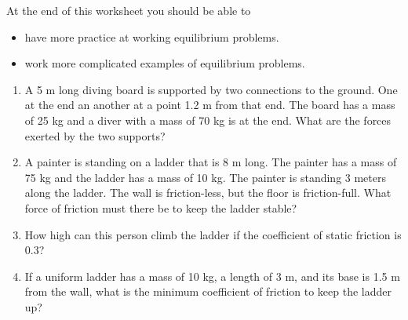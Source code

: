 At the end of this worksheet you should be able to  
\begin{itemize}
	\item have more practice at working equilibrium problems.
	\item work more complicated examples of equilibrium problems.

\end{itemize}


\begin{enumerate}
	\setlength\itemsep{2 in}
	
	\item A 5 m long diving board is supported by two connections to the ground. One at the end an another at a point 1.2 m from that end. The board has a mass of 25 kg and a diver with a mass of 70 kg is at the end. What are the forces exerted by the two supports?
	
	\item A painter is standing on a ladder that is 8 m long. The painter has a mass of 75 kg and the ladder has a mass of 10 kg. The painter is standing 3 meters along the ladder. The wall is friction-less, but the floor is friction-full. What force of friction must there be to keep the ladder stable?
	
	\item How high can this person climb the ladder if the coefficient of static friction is 0.3?
	
	\item If a uniform ladder has a mass of 10 kg, a length of 3 m, and its base is 1.5 m from the wall, what is the minimum coefficient of friction to keep the ladder up?
	
	
\end{enumerate}